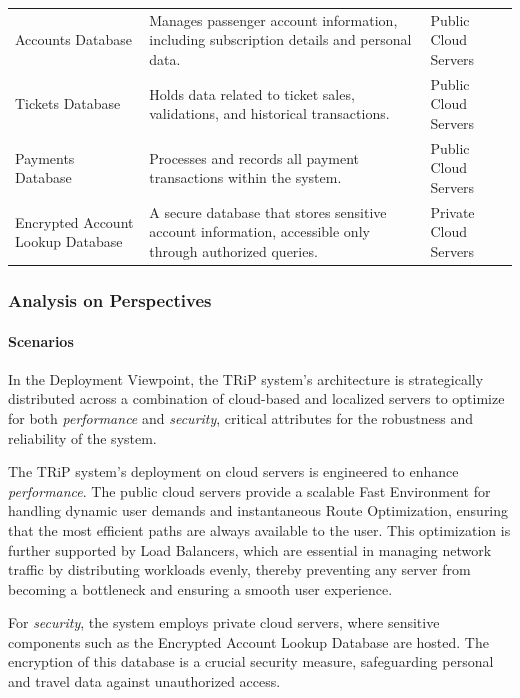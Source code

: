 \begin{table}[H]
\begin{tabularx}{\textwidth}{@{}lXX@{}}
    Accounts Database & Manages passenger account information, including subscription details and personal data. & Public Cloud Servers \\
    Tickets Database & Holds data related to ticket sales, validations, and historical transactions. & Public Cloud Servers \\
    Payments Database & Processes and records all payment transactions within the system. & Public Cloud Servers \\
    Encrypted Account Lookup Database & A secure database that stores sensitive account information, accessible only through authorized queries. & Private Cloud Servers \\
    \bottomrule
    \end{tabularx}
\end{table}
\subsubsection{Analysis on Perspectives}

\paragraph{Scenarios}
\scenarioOneDeployment
\scenarioTwoDeployment

In the Deployment Viewpoint, the TRiP system's architecture is strategically distributed across a combination of cloud-based and localized servers to optimize for both \textit{performance} and \textit{security}, critical attributes for the robustness and reliability of the system.

The TRiP system's deployment on cloud servers is engineered to enhance \textit{performance}. The public cloud servers provide a scalable Fast Environment for handling dynamic user demands and instantaneous Route Optimization, ensuring that the most efficient paths are always available to the user. This optimization is further supported by Load Balancers, which are essential in managing network traffic by distributing workloads evenly, thereby preventing any server from becoming a bottleneck and ensuring a smooth user experience. 

For \textit{security}, the system employs private cloud servers, where sensitive components such as the Encrypted Account Lookup Database are hosted. The encryption of this database is a crucial security measure, safeguarding personal and travel data against unauthorized access. 